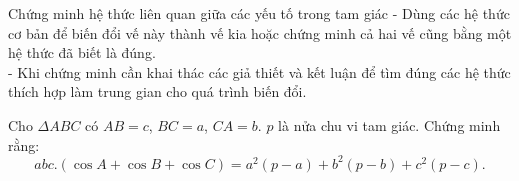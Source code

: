 \begin{dang}{Chứng minh hệ thức liên quan giữa các yếu tố trong tam giác}
	- Dùng các hệ thức cơ bản để biến đổi vế này thành vế kia hoặc chứng minh cả hai vế cũng bằng một hệ thức đã biết là đúng.
	\\- Khi chứng minh cần khai thác các giả thiết và kết luận để tìm đúng các hệ thức thích hợp làm trung gian cho quá trình biến đổi.
\end{dang}
\begin{vd}%
	Cho $ \Delta ABC $ có $ AB=c $, $ BC=a $, $ CA=b $. $ p $ là nửa chu vi tam giác. Chứng minh rằng:
	$$ abc.\left(\cos A+\cos B+\cos C \right)=a^2\left(p-a \right)+b^2 \left(p-b \right)+c^2\left(p-c \right) .$$
\end{vd}
